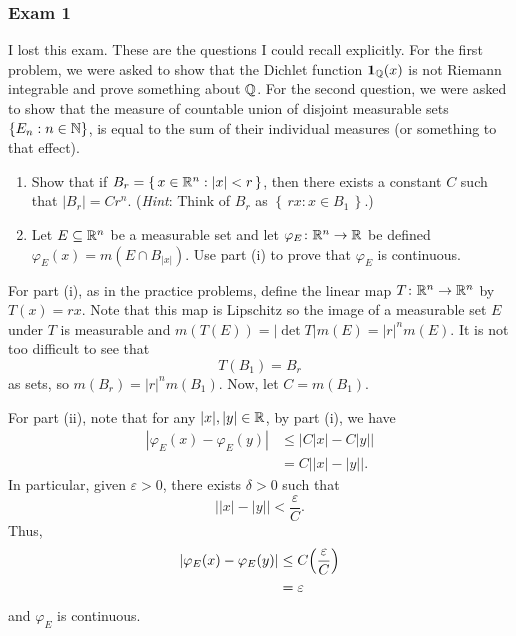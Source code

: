\subsubsection{Exam 1}
\setcounter{exercise}{0}
\setcounter{equation}{0}

I lost this exam. These are the questions I could recall explicitly. For
the first problem, we were asked to show that the Dichlet function
\(\operatorname{\mathbf{1}}_{\mathbb{Q}}(x)\) is not Riemann integrable and prove something about
\(\mathbb{Q}\). For the second question, we were asked to show that the measure
of countable union of disjoint measurable sets \(\{E_n:n\in\mathbb{N}\}\), is
equal to the sum of their individual measures (or something to that
effect).
\begin{problem}
\end{problem}

\begin{problem}
\end{problem}

\begin{problem}
\hfill
\begin{enumerate}[label=(\roman*)]
\item Show that if \(B_r=\left\{\,x\in\mathbb{R}^n:|x|<r\,\right\}\), then there
  exists a constant \(C\) such that \(|B_r|=Cr^n\). (\emph{Hint}: Think of
  \(B_r\) as \(\left\{\,rx:x\in B_1\,\right\}\).)
\item Let \(E\subseteq\mathbb{R}^n\) be a measurable set and let
  \(\varphi_E\colon\mathbb{R}^n\to\mathbb{R}\) be defined
  \(\varphi_E(x)=m(E\cap B_{|x|})\). Use part (i) to prove that
  \(\varphi_E\) is continuous.
\end{enumerate}
\end{problem}
\begin{solution}
  For part (i), as in the practice problems, define the linear map
  \(T\colon\mathbb{R}^n\to\mathbb{R}^n\) by \(T(x)=rx\). Note that this map is
  Lipschitz so the image of a measurable set \(E\) under \(T\) is
  measurable and \(m(T(E))=|{\det T}|m(E)=|r|^nm(E)\). It is not too
  difficult to see that
  \[
    T(B_1)=B_r
  \]
  as sets, so \(m(B_r)=|r|^nm(B_1)\). Now, let \(C=m(B_1)\).

  For part (ii), note that for any \(|x|,|y|\in\mathbb{R}\), by part (i), we have
  \begin{align*}
    |\varphi_E(x)-\varphi_E(y)|
    &\leq\bigr|C|x|-C|y|\bigl|\\
    &=C\bigl||x|-|y|\bigr|.
  \end{align*}
  In particular, given \(\varepsilon>0\), there exists \(\delta>0\) such
  that
  \[
    \bigl||x|-|y|\bigr|<\frac{\varepsilon}{C}.
  \]
  Thus,
  \begin{align*}
    |\varphi_E(x)-\varphi_E(y)|
    &\leq C\Bigl(\frac{\varepsilon}{C}\Bigl)\\
    &=\varepsilon
  \end{align*}
  and \(\varphi_E\) is continuous.
\end{solution}

